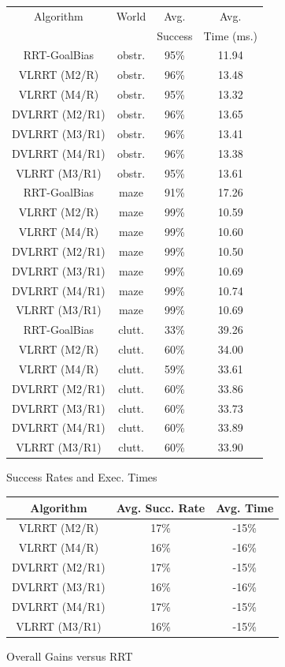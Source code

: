 \documentclass[10pt,twoside,twocolumn]{article}
\begin{document}
\begin{figure}[t]
\begin{center}
\footnotesize{
\begin{tabular}{|cccc|}
\hline
Algorithm & World & Avg. & Avg.\\
& & Success & Time (ms.)\\
\hline
RRT-GoalBias & obstr. & 95\% & 11.94\\
VLRRT (M2/R) & obstr. & 96\% & 13.48\\
VLRRT (M4/R) & obstr. & 95\% & 13.32\\
DVLRRT (M2/R1) & obstr. & 96\% & 13.65\\
DVLRRT (M3/R1) & obstr. & 96\% & 13.41\\
DVLRRT (M4/R1) & obstr. & 96\% & 13.38\\
VLRRT (M3/R1) & obstr. & 95\% & 13.61\\ 
\hline
RRT-GoalBias & maze & 91\% & 17.26\\
VLRRT (M2/R) & maze & 99\% & 10.59\\
VLRRT (M4/R) & maze & 99\% & 10.60\\
DVLRRT (M2/R1) & maze & 99\% & 10.50\\
DVLRRT (M3/R1) & maze & 99\% & 10.69\\
DVLRRT (M4/R1) & maze & 99\% & 10.74\\
VLRRT (M3/R1) & maze & 99\% & 10.69\\ 
\hline
RRT-GoalBias & clutt. & 33\% & 39.26\\
VLRRT (M2/R) & clutt. & 60\% & 34.00\\
VLRRT (M4/R) & clutt. & 59\% & 33.61\\
DVLRRT (M2/R1) & clutt. & 60\% & 33.86\\
DVLRRT (M3/R1) & clutt. & 60\% & 33.73\\
DVLRRT (M4/R1) & clutt. & 60\% & 33.89\\
VLRRT (M3/R1) & clutt. & 60\% & 33.90\\ 
\hline
\end{tabular}}
\end{center}
\caption{Success Rates and Exec. Times}\label{fig:worlds}
\end{figure}
\begin{figure}[t]
\begin{center}
\footnotesize{
\begin{tabular}{|ccc|}
\hline
Algorithm & Avg. Succ. Rate & Avg. Time\\
\hline
VLRRT (M2/R) & 17\% & -15\%\\
VLRRT (M4/R) & 16\% & -16\%\\
DVLRRT (M2/R1) & 17\% & -15\%\\
DVLRRT (M3/R1) & 16\% & -16\%\\
DVLRRT (M4/R1) & 17\% & -15\%\\
VLRRT (M3/R1) & 16\% & -15\%\\ 
\hline
\end{tabular}}
\end{center}
\caption{Overall Gains versus RRT}
\end{figure}
\end{document}
